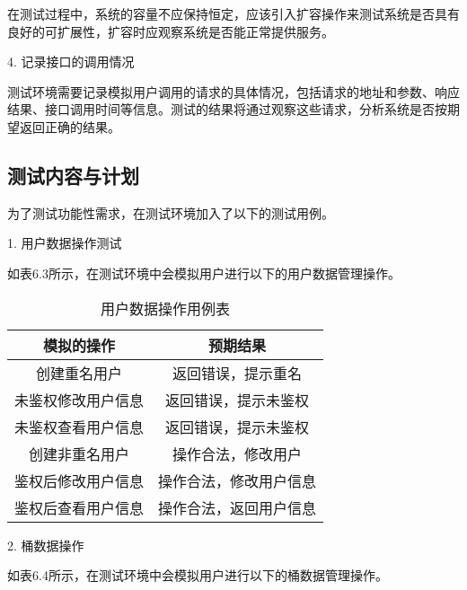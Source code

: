 在测试过程中，系统的容量不应保持恒定，应该引入扩容操作来测试系统是否具有良好的可扩展性，扩容时应观察系统是否能正常提供服务。

4. 记录接口的调用情况

测试环境需要记录模拟用户调用的请求的具体情况，包括请求的地址和参数、响应结果、接口调用时间等信息。测试的结果将通过观察这些请求，分析系统是否按期望返回正确的结果。

\subsection{测试内容与计划}%
为了测试功能性需求，在测试环境加入了以下的测试用例。

1. 用户数据操作测试

如表6.3所示，在测试环境中会模拟用户进行以下的用户数据管理操作。

\begin{table}[h]
  \centering
  \caption{用户数据操作用例表}
  \begin{tabular}{cc}
    \toprule
    模拟的操作   & 预期结果   \\
    \midrule
    创建重名用户           & 返回错误，提示重名  \\
    未鉴权修改用户信息     & 返回错误，提示未鉴权     \\
    未鉴权查看用户信息     & 返回错误，提示未鉴权  \\
    创建非重名用户         & 操作合法，修改用户     \\
    鉴权后修改用户信息     & 操作合法，修改用户信息     \\
    鉴权后查看用户信息      & 操作合法，返回用户信息     \\
    \bottomrule
  \end{tabular}
\end{table}

2. 桶数据操作

如表6.4所示，在测试环境中会模拟用户进行以下的桶数据管理操作。

